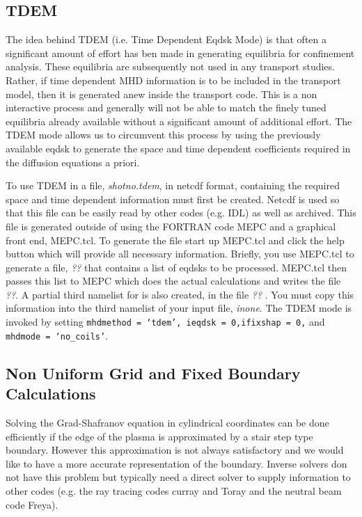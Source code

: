 \subsection{TDEM}\label{tdem}
The idea behind  TDEM (i.e. Time Dependent Eqdsk Mode) is that  often a
significant amount of effort has ben made in generating equilibria for
confinement analysis. These equilibria are  subsequently not used in any
transport studies. Rather, if time dependent MHD information is to be included
in the transport model, then it is generated anew inside the transport code.
This is a non interactive process and generally will not be able to match the
finely tuned equilibria already available without a significant amount of
additional effort. The TDEM mode allows us to circumvent this process by using
the previously available  eqdsk to generate the space and time dependent
coefficients required in the diffusion equations a priori.

To use TDEM in \ot a file, \emph{shotno.tdem}, in netcdf format, containing the
required space and time dependent information must first be created. Netcdf is
used so that this file can be easily  read by other codes (e.g. IDL) as well as
archived.  This file is generated outside of \ot using the FORTRAN code MEPC and
a graphical front end, MEPC.tcl. To generate the file start up MEPC.tcl and
click the help button which will provide all necessary information. Briefly, you
use MEPC.tcl to generate a file, \emph{??} that contains a list of eqdsks to be
processed. MEPC.tcl then passes this list to MEPC which does the actual
calculations and writes the file \emph{??}. A partial third namelist for \ot is
also created, in the file \emph{??} . You must copy this information  into the
third namelist of your \ot input file, \emph{inone}. The TDEM mode is invoked by
setting  \texttt{mhdmethod = `tdem', ieqdsk = 0,ifixshap = 0,} and
\texttt{mhdmode = `no\_coils'}.

\subsection{Non Uniform Grid and Fixed Boundary Calculations}

Solving the Grad-Shafranov equation in cylindrical coordinates can be done
efficiently if the edge of the plasma is approximated by a stair step type
boundary. However this approximation is not always satisfactory and we would
like to  have a more accurate representation of the boundary. Inverse solvers
don not have this problem but typically need a direct solver to supply
information to other codes  (e.g. the ray tracing codes curray and Toray and the
neutral beam code Freya).

